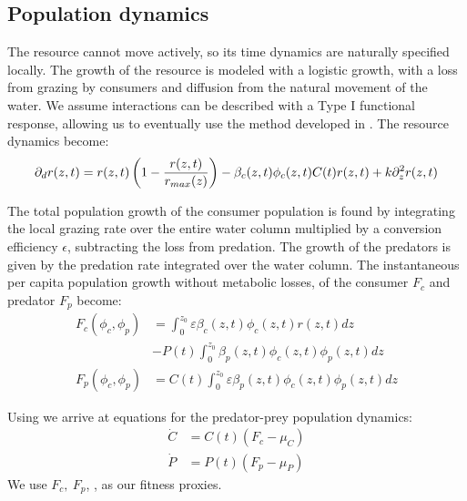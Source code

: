 \subsection{Population dynamics}

The resource cannot move actively, so its time dynamics are naturally specified locally. The growth of the resource is modeled with a logistic growth, with a loss from grazing by consumers and diffusion from the natural movement of the water. We assume interactions can be described with a Type I functional response, allowing us to eventually use the method developed in . The resource dynamics become:
\begin{equation}
  \label{eq:res_dyn}
	\partial_d r(z,t) = r(z,t)\pa{1-\frac{r(z,t)}{r_{max}(z)}} - \beta_c(z,t)\phi_c(z,t)C(t) r(z,t)  + k \partial_z^2 r(z,t) \\
\end{equation}

The total population growth of the consumer population is found by integrating the local grazing rate over the entire water column multiplied by a conversion efficiency $\epsilon$, subtracting the loss from predation. The growth of the predators is given by the predation rate integrated over the water column. The instantaneous per capita population growth without metabolic losses, of the consumer $F_c$ and predator $F_p$  become:
\begin{equation}
  \begin{split}
	F_c(\phi_c, \phi_p) &= \int_0^{z_0} \varepsilon \beta_c(z,t)\phi_c(z,t)r(z,t) dz\\ &- P(t)\int_0^{z_0} \beta_p(z,t) \phi_c(z,t) \phi_p(z,t)dz \\
	F_p(\phi_c, \phi_p) &=  C(t) \int_0^{z_0} \varepsilon \beta_p(z,t)\phi_c(z,t)\phi_p(z,t) dz
  \end{split}
  \label{eq:fitness}
\end{equation}


Using  we arrive at equations for the predator-prey population dynamics:
\begin{equation}
  \begin{split}
	\dot{C} &= C(t)\left ( F_c - \mu_C \right ) \\
	\dot{P} &= P(t) \left ( F_p - \mu_P  \right )
\end{split}
  \label{eq:population_growth_prob_dens}
\end{equation}
We use $F_c,~F_p$, , as our fitness proxies.
